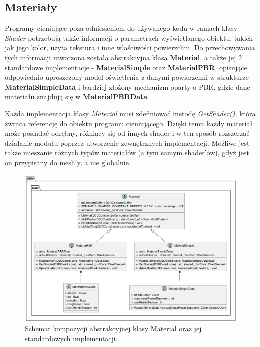 	\vfill
	\clearpage
	
\subsection{Materiały}
	Programy cieniujące poza odniesieniem do używanego kodu w ramach klasy \textit{Shader} potrzebują także informacji o parametrach wyświetlanego obiektu, takich jak jego kolor, użyta tekstura i inne właściwości powierzchni.	Do przechowywania tych informacji utworzona została abstrakcyjna klasa \textbf{Material}, a także jej 2 standardowe implementacje - \textbf{MaterialSimple} oraz \textbf{MaterialPBR}, opisujące odpowiednio uproszczony model oświetlenia z danymi powierzchni w strukturze \textbf{MaterialSimpleData} i bardziej złożony mechanizm oparty o PBR, gdzie dane materiału znajdują się w \textbf{MaterialPBRData}.
	
	Każda implementacja klasy \textit{Material} musi zdefiniować metodę \textit{GetShader()}, która zwraca referencję do obiektu programu cieniującego. Dzięki temu każdy materiał może posiadać odrębny, różniący się od innych shader i w ten sposób rozszerzać działanie modułu poprzez utworzenie zewnętrznych implementacji. Możliwe jest także mieszanie różnych typów materiałów (a tym samym shader'ów), gdyż jest on przypisany do mesh'y, a nie globalnie.
		
	\begin{figure}[h!]
		\centering
		\includegraphics[width=\textwidth]{images/UML/materials.png}
		\caption{Schemat kompozycji abstrakcyjnej klasy Material oraz jej standardowych implementacji.}
		\label{UML_Material}
	\end{figure}
	
